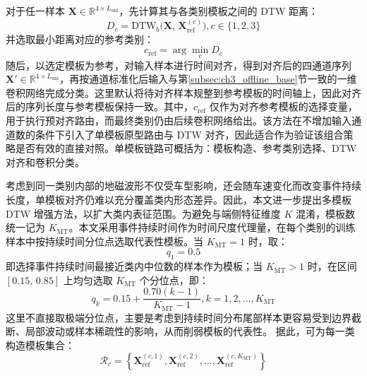 \documentclass{xdupgthesis}
\begin{document}
对于任一样本 $\mathbf{X}\in\mathbb{R}^{4\times L_{\mathrm{uni}}}$，先计算其与各类别模板之间的 DTW 距离：
\begin{equation}
    D_c=\mathrm{DTW}_{b}\big(\mathbf{X},\,\mathbf{X}_{\mathrm{ref}}^{(c)}\big), c\in\{1,2,3\}
\end{equation}
并选取最小距离对应的参考类别：
\begin{equation}
    c_{\mathrm{ref}}=\arg\min_c D_c
\end{equation}
随后，以选定模板为参考，对输入样本进行时间对齐，得到对齐后的四通道序列 $\mathbf{X}'\in\mathbb{R}^{4\times L_{\mathrm{uni}}}$，再按通道标准化后输入与第\ref{subsec:ch3_offline_base}节一致的一维卷积网络完成分类。这里默认将待对齐样本规整到参考模板的时间轴上，因此对齐后的序列长度与参考模板保持一致。其中，$c_{\mathrm{ref}}$ 仅作为对齐参考模板的选择变量，用于执行预对齐路由，而最终类别仍由后续卷积网络给出。该方法在不增加输入通道数的条件下引入了单模板原型路由与 DTW 对齐，因此适合作为验证该组合策略是否有效的直接对照。单模板链路可概括为：模板构造、参考类别选择、DTW 对齐和卷积分类。

考虑到同一类别内部的地磁波形不仅受车型影响，还会随车速变化而改变事件持续长度，单模板对齐仍难以充分覆盖类内形态差异。因此，本文进一步提出多模板 DTW 增强方法，以扩大类内表征范围。为避免与端侧特征维度 $K$ 混淆，模板数统一记为 $K_{\mathrm{MT}}$。本文采用事件持续时间作为时间尺度代理量，在每个类别的训练样本中按持续时间分位点选取代表性模板。当 $K_{\mathrm{MT}}=1$ 时，取：
\begin{equation}
    q_1=0.5
\end{equation}
即选择事件持续时间最接近类内中位数的样本作为模板；当 $K_{\mathrm{MT}}>1$ 时，在区间 $[0.15,\,0.85]$ 上均匀选取 $K_{\mathrm{MT}}$ 个分位点，即：
\begin{equation}
    q_k=0.15+\frac{0.70(k-1)}{K_{\mathrm{MT}}-1}, k=1,2,\ldots,K_{\mathrm{MT}}
\end{equation}
这里不直接取极端分位点，主要是考虑到持续时间分布尾部样本更容易受到边界截断、局部波动或样本稀疏性的影响，从而削弱模板的代表性。
据此，可为每一类构造模板集合：
\begin{equation}
    \mathcal{R}_c=
    \left\{
    \mathbf{X}_{\mathrm{ref}}^{(c,1)},
    \mathbf{X}_{\mathrm{ref}}^{(c,2)},
    \ldots,
    \mathbf{X}_{\mathrm{ref}}^{(c,K_{\mathrm{MT}})}
    \right\}
\end{equation}
\end{document}
